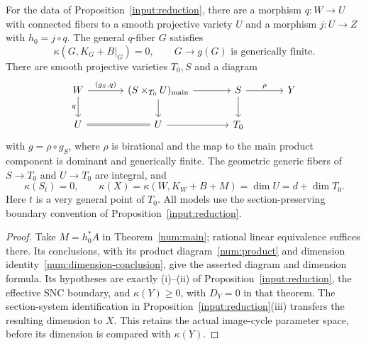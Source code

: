 \begin{corollary}
\label{input:second-iitaka}
For the data of Proposition~\ref{input:reduction}, there are
a morphism $q:W\to U$ with connected fibers to a smooth projective
variety $U$ and a morphism
$j:U\to Z$ with $h_0=j\circ q$. The general $q$-fiber $G$ satisfies
\[
 \kappa(G,K_G+B|_G)=0,
 \qquad G\longrightarrow g(G)\text{ is generically finite}.
\]
There are smooth projective varieties $T_0,S$ and a diagram
\[
\begin{tikzcd}[column sep=large]
 W\arrow[r,"{(g_S,q)}"]\arrow[d,"q"'] &
 (S\times_{T_0}U)_{\mathrm{main}}\arrow[r]\arrow[d] &
 S\arrow[r,"\rho"]\arrow[d] &Y\\
 U\arrow[r,equal]&U\arrow[r]&T_0&
\end{tikzcd}
\]
with $g=\rho\circ g_S$, where $\rho$ is birational and the map
to the main product component is dominant and generically finite.
The geometric generic fibers of $S\to T_0$ and $U\to T_0$ are
integral, and
\begin{equation}\label{eq:imported-dimension}
 \kappa(S_t)=0,
 \qquad \kappa(X)=\kappa(W,K_W+B+M)=\dim U=d+\dim T_0.
\end{equation}
Here $t$ is a very general point of $T_0$.
All models use the section-preserving boundary convention of
Proposition~\ref{input:reduction}.
\end{corollary}

\begin{proof}
Take $M=h_0^*A$ in Theorem~\ref{num:main}; rational linear
equivalence suffices there. Its conclusions, with its
product diagram~\eqref{num:product} and dimension
identity~\eqref{num:dimension-conclusion}, give the asserted diagram
and dimension formula. Its hypotheses are exactly
(i)--(ii) of Proposition~\ref{input:reduction}, the effective SNC
boundary, and $\kappa(Y)\geq0$, with $D_Y=0$ in that theorem.
The section-system identification
in Proposition~\ref{input:reduction}(iii) transfers the resulting
dimension to $X$. This retains the actual image-cycle parameter
space, before its dimension is compared with $\kappa(Y)$.
\end{proof}

